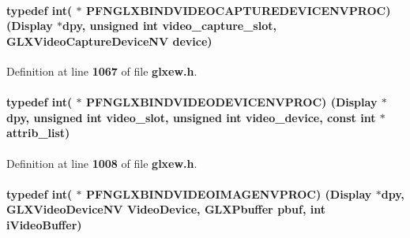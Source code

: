 \paragraph[{P\+F\+N\+G\+L\+X\+B\+I\+N\+D\+V\+I\+D\+E\+O\+C\+A\+P\+T\+U\+R\+E\+D\+E\+V\+I\+C\+E\+N\+V\+P\+R\+OC}]{\setlength{\rightskip}{0pt plus 5cm}typedef {\bf int}( $\ast$  P\+F\+N\+G\+L\+X\+B\+I\+N\+D\+V\+I\+D\+E\+O\+C\+A\+P\+T\+U\+R\+E\+D\+E\+V\+I\+C\+E\+N\+V\+P\+R\+OC) (Display $\ast$dpy, unsigned {\bf int} video\+\_\+capture\+\_\+slot, {\bf G\+L\+X\+Video\+Capture\+Device\+NV} {\bf device})}\label{glxew_8h_aad11889150720da15be44859ae7672da}


Definition at line {\bf 1067} of file {\bf glxew.\+h}.

\paragraph[{P\+F\+N\+G\+L\+X\+B\+I\+N\+D\+V\+I\+D\+E\+O\+D\+E\+V\+I\+C\+E\+N\+V\+P\+R\+OC}]{\setlength{\rightskip}{0pt plus 5cm}typedef {\bf int}( $\ast$  P\+F\+N\+G\+L\+X\+B\+I\+N\+D\+V\+I\+D\+E\+O\+D\+E\+V\+I\+C\+E\+N\+V\+P\+R\+OC) (Display $\ast$dpy, unsigned {\bf int} video\+\_\+slot, unsigned {\bf int} video\+\_\+device, const {\bf int} $\ast$attrib\+\_\+list)}\label{glxew_8h_aeb7c9392c7cd966b3063b8a4eafa6055}


Definition at line {\bf 1008} of file {\bf glxew.\+h}.

\paragraph[{P\+F\+N\+G\+L\+X\+B\+I\+N\+D\+V\+I\+D\+E\+O\+I\+M\+A\+G\+E\+N\+V\+P\+R\+OC}]{\setlength{\rightskip}{0pt plus 5cm}typedef {\bf int}( $\ast$  P\+F\+N\+G\+L\+X\+B\+I\+N\+D\+V\+I\+D\+E\+O\+I\+M\+A\+G\+E\+N\+V\+P\+R\+OC) (Display $\ast$dpy, {\bf G\+L\+X\+Video\+Device\+NV} Video\+Device, {\bf G\+L\+X\+Pbuffer} pbuf, {\bf int} {\bf i\+Video\+Buffer})}\label{glxew_8h_ae52a0109987352d641fea9ada8aecf48}


